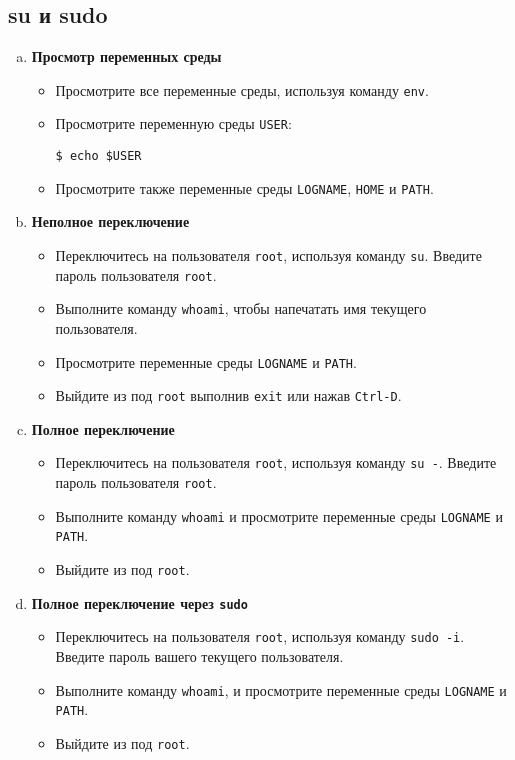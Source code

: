 \documentclass{article}
\begin{document}
\subsection{su и sudo}
\begin{enumerate}[a.]

\item \textbf{Просмотр переменных среды}
\begin{itemize}
\item Просмотрите все переменные среды, используя команду \texttt{env}.
\item Просмотрите переменную среды \texttt{USER}:
\begin{lstlisting}
$ echo $USER
\end{lstlisting}
\item Просмотрите также переменные среды \texttt{LOGNAME}, \texttt{HOME} и \texttt{PATH}.
\end{itemize}

\item \textbf{Неполное переключение}
\begin{itemize}
\item Переключитесь на пользователя \texttt{root}, используя команду \texttt{su}.
Введите пароль пользователя \texttt{root}.
\item Выполните команду \texttt{whoami}, чтобы напечатать имя текущего пользователя.
\item Просмотрите переменные среды \texttt{LOGNAME} и \texttt{PATH}.
\item Выйдите из под \texttt{root} выполнив \texttt{exit} или нажав \texttt{Ctrl-D}.
\end{itemize}

\item \textbf{Полное переключение}
\begin{itemize}
\item Переключитесь на пользователя \texttt{root}, используя команду \texttt{su -}.
Введите пароль пользователя \texttt{root}.
\item Выполните команду \texttt{whoami} и просмотрите переменные среды \texttt{LOGNAME} и \texttt{PATH}.
\item Выйдите из под \texttt{root}.
\end{itemize}

\item \textbf{Полное переключение через \texttt{sudo}}
\begin{itemize}
\item Переключитесь на пользователя \texttt{root}, используя команду \texttt{sudo -i}.
Введите пароль вашего текущего пользователя.
\item Выполните команду \texttt{whoami}, и просмотрите переменные среды \texttt{LOGNAME} и \texttt{PATH}.
\item Выйдите из под \texttt{root}.
\end{itemize}


\end{enumerate}
\end{document}
